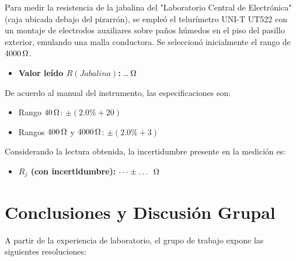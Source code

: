 \documentclass{informeutn}
\begin{document}
Para medir la resistencia de la jabalina del "Laboratorio Central de Electrónica" (caja ubicada debajo del pizarrón), se empleó el telurímetro UNI-T UT522 con un montaje de electrodos auxiliares sobre paños húmedos en el piso del pasillo exterior, emulando una malla conductora. Se seleccionó inicialmente el rango de $4000\ohm$.

\begin{itemize}
    \item \textbf{Valor leído $R(Jabalina)$:} \dots $\ohm$
\end{itemize}

De acuerdo al manual del instrumento, las especificaciones son:
\begin{itemize}
    \item Rango $40\ohm$: $\pm(2.0\% + 20)$
    \item Rangos $400\ohm$ y $4000\ohm$: $\pm(2.0\% + 3)$
\end{itemize}

Considerando la lectura obtenida, la incertidumbre presente en la medición es:
\begin{itemize}
    \item \textbf{$R_j$ (con incertidumbre):} $\dots \pm \dots \ \ohm$
\end{itemize}

\chapter{Conclusiones y Discusión Grupal}

A partir de la experiencia de laboratorio, el grupo de trabajo expone las siguientes resoluciones:
\end{document}
